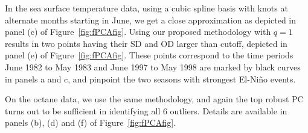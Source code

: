 In the sea surface temperature data, using a cubic spline basis with knots at alternate 
months starting in June, we get a close approximation as depicted in 
panel (c) of Figure~\ref{fig:fPCAfig}. Using our proposed methodology with $q =1$ 
results in two points having their SD and OD larger than cutoff, depicted in  
panel (e) of Figure~\ref{fig:fPCAfig}. These points correspond to the time periods June 
1982 to May 1983 and June 1997 to May 1998 are marked by black curves in panels a and c, 
and pinpoint the two seasons with strongest El-Ni\~no events. 

On the octane data, we use the same methodology,  and again the top robust PC turns out to be sufficient in identifying all 6 outliers.  Details are available in  panels (b), (d) and (f) of Figure~\ref{fig:fPCAfig}.